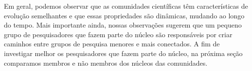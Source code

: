 
Em geral, podemos observar que as comunidades científicas têm características de evolução semelhantes e que essas propriedades 
são dinâmicas, mudando ao longo do tempo. Mais importante ainda, nossas observações sugerem que um pequeno grupo de 
pesquisadores que fazem parte do núcleo são responsáveis por criar caminhos entre grupos de pesquisa menores e mais 
conectados. A fim de investigar melhor os pesquisadores que fazem parte do núcleo, na próxima seção comparamos membros e 
não membros dos núcleos das comunidades.



